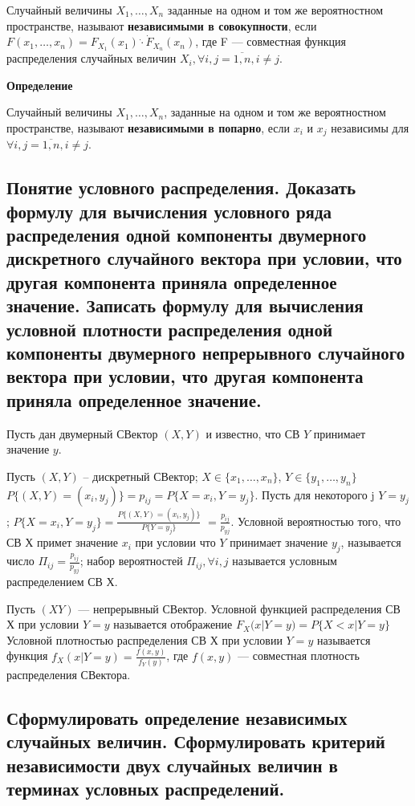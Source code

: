 Случайный величины $X_1, \dots, X_n$ заданные на одном и том же вероятностном пространстве, называют \textbf{независимыми в совокупности}, если $F(x_1, \dots, x_n) = F_{X_1}(x_1) \dot \cdot \dot F_{X_n}(x_n)$, где F --- совместная функция распределения случайных величин $X_i, \forall i,j = \overline{1,n}, i \neq j$.

\textbf{Определение}

Случайный величины $X_1, \dots, X_n$, заданные на одном и том же вероятностном пространстве, называют \textbf{независимыми в попарно}, если $x_i$ и $x_j$ независимы  для $\forall i,j = \overline{1,n}, i \neq j$.

\subsection{Понятие условного распределения. Доказать формулу для вычисления условного ряда распределения одной компоненты двумерного дискретного случайного вектора при условии, что другая компонента приняла определенное значение. Записать формулу для вычисления условной плотности распределения одной компоненты двумерного непрерывного случайного вектора при условии, что другая компонента приняла определенное значение.}


Пусть дан двумерный СВектор $(X, Y)$ и известно, что СВ $Y$ принимает значение $y$.


Пусть $(X, Y)$ – дискретный СВектор; $X \in \{x_1, \dots, x_n\}$, $Y \in \{y_1, \dots, y_n\}$ $P\{(X, Y)=(x_i, y_j)\} = p_{ij} = P\{X=x_i, Y=y_j\}$. Пусть для некоторого j $Y=y_j$; $P\{X=x_i, Y=y_j\} = \frac{P\{(X, Y)=(x_i, y_j)\}}{P\{Y=y_j\}}$ $=\frac{p_{ij}}{p_{yj}}$. Условной вероятностью того, что СВ Х примет значение $x_i$ при условии что $Y$ принимает значение $y_j$, называется число $\Pi_{ij}=\frac{p_{ij}}{p_{yj}}$; набор вероятностей $\Pi_{ij}, \forall i, j$ называется условным распределением СВ Х.

Пусть $(XY)$ --- непрерывный СВектор. Условной функцией распределения СВ Х при условии $Y = y$ называется отображение $F_X(x|Y=y) = P\{X < x|Y=y\}$ Условной плотностью распределения СВ Х при условии $Y=y$ называется функция $f_X(x|Y=y)=\frac{f(x, y)}{f_Y(y)}$, где $f(x,y)$ --- совместная плотность распределения СВектора.

\subsection{Сформулировать определение независимых случайных величин. Сформулировать критерий независимости двух случайных величин в терминах условных распределений.}

